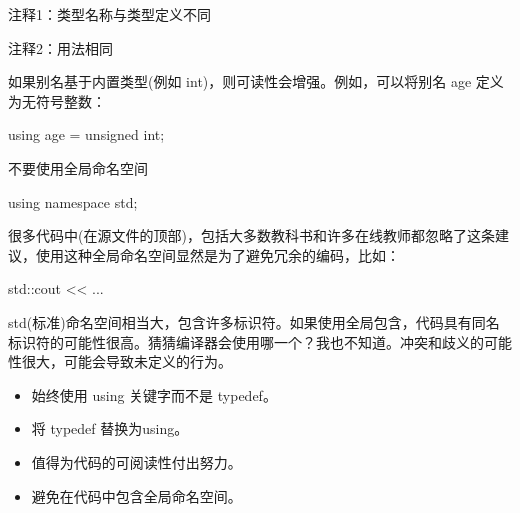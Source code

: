 {\footnotesize
注释1：类型名称与类型定义不同

注释2：用法相同
}

如果别名基于内置类型(例如 int)，则可读性会增强。例如，可以将别名 age 定义为无符号整数：

\begin{cpp}
using age = unsigned int;
\end{cpp}

不要使用全局命名空间

\begin{cpp}
using namespace std;
\end{cpp}

很多代码中(在源文件的顶部)，包括大多数教科书和许多在线教师都忽略了这条建议，使用这种全局命名空间显然是为了避免冗余的编码，比如：

\begin{cpp}
std::cout << ...
\end{cpp}

std(标准)命名空间相当大，包含许多标识符。如果使用全局包含，代码具有同名标识符的可能性很高。猜猜编译器会使用哪一个？我也不知道。冲突和歧义的可能性很大，可能会导致未定义的行为。


\begin{itemize}
\item
始终使用 using 关键字而不是 typedef。

\item
将 typedef 替换为using。

\item
值得为代码的可阅读性付出努力。

\item
避免在代码中包含全局命名空间。
\end{itemize}
